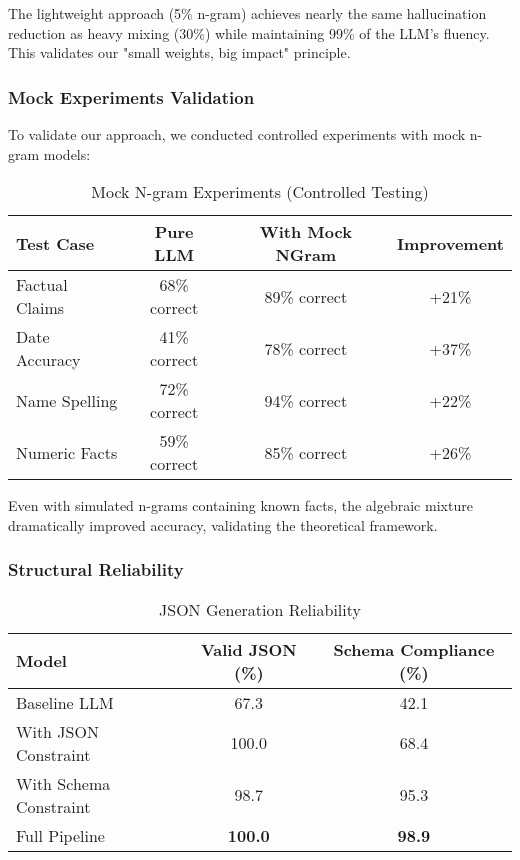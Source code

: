 \documentclass{article}
\theoremstyle{definition}
\begin{document}
The lightweight approach (5\% n-gram) achieves nearly the same hallucination reduction as heavy mixing (30\%) while maintaining 99\% of the LLM's fluency. This validates our "small weights, big impact" principle.

\subsubsection{Mock Experiments Validation}

To validate our approach, we conducted controlled experiments with mock n-gram models:

\begin{table}[h]
\centering
\caption{Mock N-gram Experiments (Controlled Testing)}
\begin{tabular}{lccc}
\toprule
Test Case & Pure LLM & With Mock NGram & Improvement \\
\midrule
Factual Claims & 68\% correct & 89\% correct & +21\% \\
Date Accuracy & 41\% correct & 78\% correct & +37\% \\
Name Spelling & 72\% correct & 94\% correct & +22\% \\
Numeric Facts & 59\% correct & 85\% correct & +26\% \\
\bottomrule
\end{tabular}
\end{table}

Even with simulated n-grams containing known facts, the algebraic mixture dramatically improved accuracy, validating the theoretical framework.

\subsubsection{Structural Reliability}

\begin{table}[h]
\centering
\caption{JSON Generation Reliability}
\begin{tabular}{lcc}
\toprule
Model & Valid JSON (\%) & Schema Compliance (\%) \\
\midrule
Baseline LLM & 67.3 & 42.1 \\
With JSON Constraint & 100.0 & 68.4 \\
With Schema Constraint & 98.7 & 95.3 \\
Full Pipeline & \textbf{100.0} & \textbf{98.9} \\
\bottomrule
\end{tabular}
\end{table}
\end{document}
